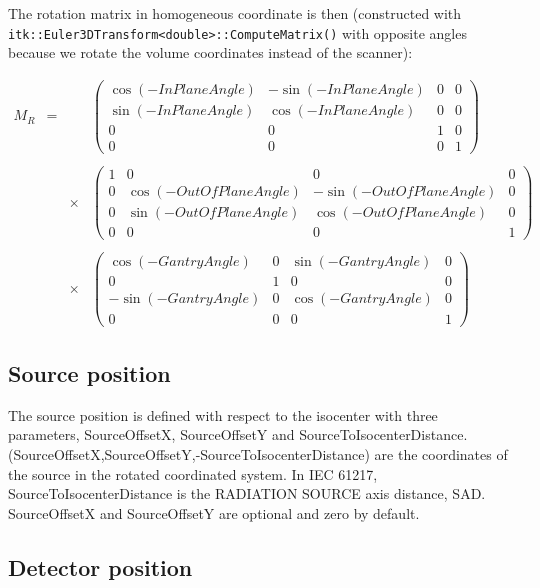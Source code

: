 \documentclass{article}
\begin{document}
The rotation matrix in homogeneous coordinate is then (constructed with\\ \verb+itk::Euler3DTransform<double>::ComputeMatrix()+ with opposite angles because we rotate the volume coordinates instead of the scanner):

$$
\begin{array}{lcll}
  M_R & = & & %
  \begin{pmatrix}
    \cos(-InPlaneAngle) & -\sin(-InPlaneAngle) & 0 & 0\\
    \sin(-InPlaneAngle) & \cos(-InPlaneAngle) & 0 & 0\\
    0 & 0 & 1 & 0\\
    0 & 0 & 0 & 1
  \end{pmatrix} \\
  \\ & & \times & %
  \begin{pmatrix}
    1 & 0 & 0 & 0\\
    0 & \cos(-OutOfPlaneAngle) & -\sin(-OutOfPlaneAngle) & 0\\
    0 & \sin(-OutOfPlaneAngle) & \cos(-OutOfPlaneAngle) & 0\\
    0 & 0 & 0 & 1
  \end{pmatrix} \\
  \\ & & \times & %
  \begin{pmatrix}
    \cos(-GantryAngle) & 0 & \sin(-GantryAngle) & 0 \\
    0 & 1 & 0 & 0 \\
    -\sin(-GantryAngle) & 0 & \cos(-GantryAngle) & 0 \\
    0 & 0 & 0 & 1
  \end{pmatrix}
\end{array}
$$

\subsection{Source position}

The source position is defined with respect to the isocenter with three parameters, SourceOffsetX, SourceOffsetY and SourceToIsocenterDistance. (SourceOffsetX,SourceOffsetY,-SourceToIsocenterDistance) are the coordinates of the source in the rotated coordinated system. In IEC 61217, SourceToIsocenterDistance is the RADIATION SOURCE axis distance, SAD. SourceOffsetX and SourceOffsetY are optional and zero by default.

\subsection{Detector position}
\end{document}
